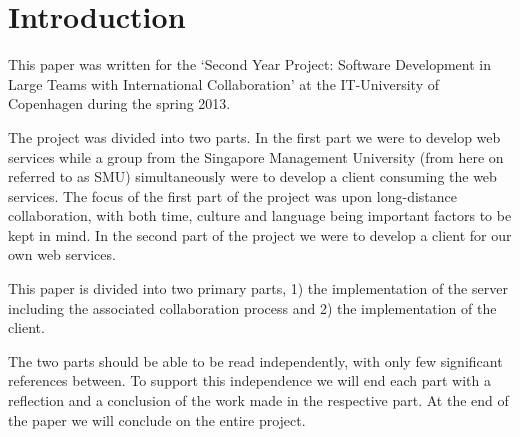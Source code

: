 \section{Introduction}
This paper was written for the `Second Year Project: Software Development in Large Teams with International Collaboration' at the IT-University of Copenhagen during the spring 2013.

The project was divided into two parts. In the first part we were to develop web services while a group from the Singapore Management University (from here on referred to as SMU) simultaneously were to develop a client consuming the web services.
The focus of the first part of the project was upon long-distance collaboration, with both time, culture and language being important factors to be kept in mind.
In the second part of the project we were to develop a client for our own web services.

This paper is divided into two primary parts, 1) the implementation of the server including the associated collaboration process and 2) the implementation of the client.

The two parts should be able to be read independently, with only few significant references between. To support this independence we will end each part with a reflection and a conclusion of the work made in the respective part.
At the end of the paper we will conclude on the entire project.
\newpage